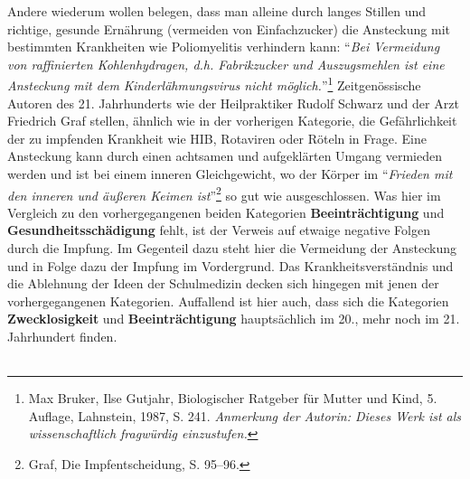 \documentclass[
    a4paper,
    12pt,
    hyphens,
    chapterprefix=true,
    headheight=33pt,
    footheight=29pt,
    headings=optiontohead, %
]{scrartcl}
\begin{document}
{Andere wiederum wollen belegen, dass man alleine durch langes Stillen und richtige, gesunde Ernährung (vermeiden von Einfachzucker) die Ansteckung mit bestimmten Krankheiten wie Poliomyelitis verhindern kann: "`\textit{Bei Vermeidung von raffinierten Kohlenhydragen, d.h. Fabrikzucker und Auszugsmehlen ist eine Ansteckung mit dem Kinderlähmungsvirus nicht möglich.}"'\footnote{Max Bruker, Ilse Gutjahr, Biologischer Ratgeber für Mutter und Kind, 5. Auflage, Lahnstein, 1987, S. 241. \textit{Anmerkung der Autorin: Dieses Werk ist als wissenschaftlich fragwürdig einzustufen.}} Zeitgenössische Autoren des 21. Jahrhunderts wie der Heilpraktiker Rudolf Schwarz und der Arzt Friedrich Graf stellen, ähnlich wie in der vorherigen Kategorie, die Gefährlichkeit der zu impfenden Krankheit wie HIB, Rotaviren oder Röteln in Frage. Eine Ansteckung kann durch einen achtsamen und aufgeklärten Umgang vermieden werden und ist bei einem inneren Gleichgewicht, wo der Körper im "`\textit{Frieden mit den inneren und äußeren Keimen ist}"'\footnote{Graf, Die Impfentscheidung, S. 95--96.} so gut wie ausgeschlossen. Was hier im Vergleich zu den vorhergegangenen beiden Kategorien \textbf{Beeinträchtigung} und \textbf{Gesundheitsschädigung} fehlt, ist der Verweis auf etwaige negative Folgen durch die Impfung. Im Gegenteil dazu steht hier die Vermeidung der Ansteckung und in Folge dazu der Impfung im Vordergrund. Das Krankheitsverständnis und die Ablehnung der Ideen der Schulmedizin decken sich hingegen mit jenen der vorhergegangenen Kategorien. Auffallend ist hier auch, dass sich die Kategorien \textbf{Zwecklosigkeit} und \textbf{Beeinträchtigung} hauptsächlich im 20., mehr noch im 21. Jahrhundert finden. \\
\\
}
\end{document}
